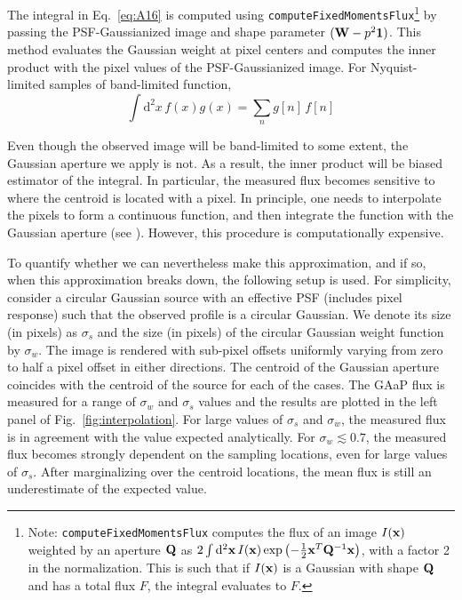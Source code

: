 \documentclass[DM,lsstdraft, authoryear,toc]{lsstdoc}
\newcommand{\rmd}{\mathrm{d}^2}
\begin{document}
The integral in Eq.~\ref{eq:A16} is computed using \texttt{computeFixedMomentsFlux}\footnote{
  Note: \texttt{computeFixedMomentsFlux} computes the flux of an image $I({\bf x})$ weighted by an aperture ${\bf Q}$ as $2\int\rmd{\bf x}\, I({\bf x})\exp\left(-\frac{1}{2} {\bf x}^T {\bf Q}^{-1}{\bf x}\right)$, with a factor 2 in the normalization. This is such that if $I({\bf x})$ is a Gaussian with shape ${\bf Q}$ and has a total flux $F$, the integral evaluates to $F$.}
  by passing the PSF-Gaussianized image and shape parameter $({\bf W}-p^2{\bf 1})$.
This method evaluates the Gaussian weight at pixel centers and computes the inner product with the pixel values of the PSF-Gaussianized image.
For Nyquist-limited samples of band-limited function,
\begin{equation}
    \int\rmd{x}\, f(x) g(x) = \sum_{n} g[n]\, f[n]
\end{equation}

Even though the observed image will be band-limited to some extent, the Gaussian aperture we apply is not.
As a result, the inner product will be biased estimator of the integral.
In particular, the measured flux becomes sensitive to where the centroid is located with a pixel.
In principle, one needs to interpolate the pixels to form a continuous function, and then integrate the function with the Gaussian aperture (see \cite{Bickerton2013}).
However, this procedure is computationally expensive.


To quantify whether we can nevertheless make this approximation, and if so, when this approximation breaks down, the following setup is used.
For simplicity, consider a circular Gaussian source with an effective PSF (includes pixel response) such that the observed profile is a circular Gaussian.
We denote its size (in pixels) as $\sigma_s$ and the size (in pixels) of the circular Gaussian weight function by $\sigma_w$.
The image is rendered with sub-pixel offsets uniformly varying from zero to half a pixel offset in either directions.
The centroid of the Gaussian aperture coincides with the centroid of the source for each of the cases.
The GAaP flux is measured for a range of $\sigma_w$ and $\sigma_s$ values and the results are plotted in the left panel of Fig.~\ref{fig:interpolation}.
For large values of $\sigma_s$ and $\sigma_w$, the measured flux is in agreement with the value expected analytically.
For $\sigma_w \lesssim 0.7$, the measured flux becomes strongly dependent on the sampling locations, even for large values of $\sigma_s$.
After marginalizing over the centroid locations, the mean flux is still an underestimate of the expected value.
\end{document}
